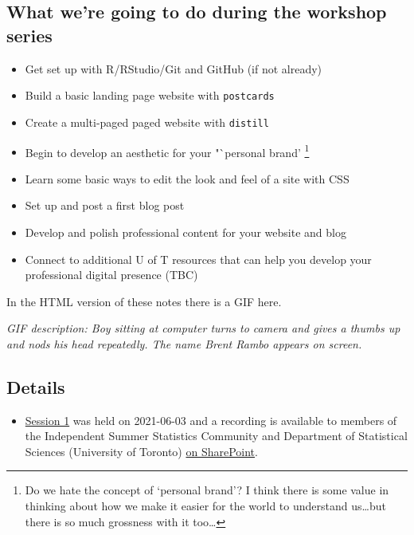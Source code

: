 \documentclass[
]{article}
\providecommand{\tightlist}{%
  \setlength{\itemsep}{0pt}\setlength{\parskip}{0pt}}
\begin{document}
\hypertarget{what-were-going-to-do-during-the-workshop-series}{%
\subsection{What we're going to do during the workshop series}\label{what-were-going-to-do-during-the-workshop-series}}

\begin{itemize}
\tightlist
\item
  Get set up with R/RStudio/Git and GitHub (if not already)
\item
  Build a basic landing page website with \texttt{postcards}
\item
  Create a multi-paged paged website with \texttt{distill}
\item
  Begin to develop an aesthetic for your "`personal brand' \footnote{Do we hate the concept of `personal brand'? I think there is some value in thinking about how we make it easier for the world to understand us\ldots but there is so much grossness with it too\ldots{}}
\item
  Learn some basic ways to edit the look and feel of a site with CSS
\item
  Set up and post a first blog post
\item
  Develop and polish professional content for your website and blog
\item
  Connect to additional U of T resources that can help you develop your professional digital presence (TBC)
\end{itemize}

In the HTML version of these notes there is a GIF here.

\emph{GIF description: Boy sitting at computer turns to camera and gives a thumbs up and nods his head repeatedly. The name Brent Rambo appears on screen.}

\hypertarget{details}{%
\subsection{Details}\label{details}}

\begin{itemize}
\tightlist
\item
  \protect\hyperlink{sesh1}{Session 1} was held on 2021-06-03 and a recording is available to members of the Independent Summer Statistics Community and Department of Statistical Sciences (University of Toronto) \href{https://utoronto.sharepoint.com/sites/ArtSci-STA/ISSC/SitePages/Past-events.aspx\#website-building-workshop-series-session-1}{on SharePoint}.
\end{itemize}
\end{document}
